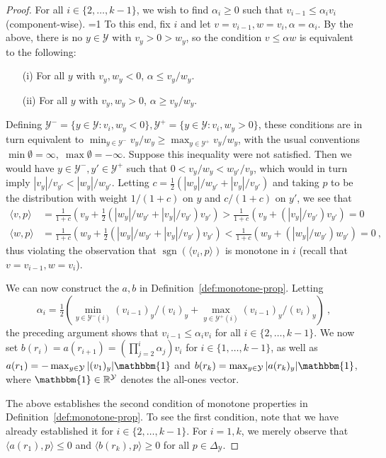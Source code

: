 \documentclass[anon,12pt]{colt2019}
\newcommand{\Comments}{1}
\newcommand{\mytodo}[2]{\ifnum\Comments=1%
  \todo[linecolor=#1!80!black,backgroundcolor=#1,bordercolor=#1!80!black]{#2}\fi}
\newcommand{\jessiet}[1]{\mytodo{purple!20!white}{JF: #1}}
\newcommand{\reals}{\mathbb{R}}
\newcommand{\simplex}{\Delta_\Y}
\newcommand{\Y}{\mathcal{Y}}
\newcommand{\inprod}[2]{\langle #1, #2 \rangle}%
\newcommand{\ones}{\mathbbm{1}}
\DeclareMathOperator*{\sgn}{sgn}
\begin{document}
\begin{proof}
  For all $i\in\{2,\ldots,k-1\}$, we wish to find $\alpha_i \geq 0$ such that $v_{i-1} \leq \alpha_i v_i$ (component-wise).
  \jessiet{How should $w$ be interpreted?}
  To this end, fix $i$ and let $v = v_{i-1}, w = v_{i}, \alpha=\alpha_i$.
  By the above, there is no $y\in\Y$ with $v_y > 0 > w_y$, so the condition $v \leq \alpha w$ is equivalent to the following:
  \begin{enumerate}
  \item[(i)] For all $y$ with $v_y,w_y < 0$, $\alpha \leq v_y/w_y$.
  \item[(ii)] For all $y$ with $v_y,w_y > 0$, $\alpha \geq v_y/w_y$.
  \end{enumerate}
  Defining $\Y^- = \{y\in\Y: v_i,w_y < 0\}, \Y^+ = \{y\in\Y: v_i,w_y > 0\}$, these conditions are in turn equivalent to $\min_{y\in\Y^-} v_y/w_y \geq \max_{y\in\Y^+} v_y/w_y$, with the usual conventions $\min \emptyset = \infty,\; \max \emptyset = -\infty$.
  Suppose this inequality were not satisfied.
  Then we would have $y \in \Y^-,y'\in\Y^+$ such that $0 < v_y/w_y < w_{y'}/v_y$, which would in turn imply $|v_y|/v_{y'} < |w_y| / w_{y'}$.
  Letting $c = \tfrac 1 2 \left(|w_y| / w_{y'} + |v_y|/v_{y'}\right)$ and taking $p$ to be the distribution with weight $1/(1+c)$ on $y$ and $c/(1+c)$ on $y'$, we see that
  \begin{align*}
    \inprod{v}{p} &= \frac 1 {1+c} \left(v_y + \tfrac 1 2 (|w_y| / w_{y'} + |v_y|/v_{y'})v_{y'}\right) > \frac 1 {1+c} \left(v_y + (|v_y|/v_{y'})v_{y'}\right) = 0
    \\
    \inprod{w}{p} &= \frac 1 {1+c} \left(w_y + \tfrac 1 2 (|w_y| / w_{y'} + |v_y|/v_{y'})v_{y'}\right) < \frac 1 {1+c} \left(w_y + (|w_y|/w_{y'})w_{y'}\right) = 0~,
  \end{align*}
  thus violating the observation that $\sgn(\inprod{v_i}{p})$ is monotone in $i$ (recall that $v = v_{i-1}, w = v_{i}$).

  We can now construct the $a,b$ in Definition~\ref{def:monotone-prop}.
  Letting
  \[\alpha_i = \tfrac 1 2 \left(\min_{y\in\Y^-(i)} (v_{i-1})_y/(v_{i})_y + \max_{y\in\Y^+(i)} (v_{i-1})_y/(v_{i})_y\right)~,\] the preceding argument shows that $v_{i-1} \leq \alpha_i v_{i}$ for all $i \in \{2,\ldots,k-1\}$.
  We now set $b(r_i) = a(r_{i+1}) = (\prod_{j=2}^i \alpha_j) v_i$ for $i\in\{1,\ldots,k-1\}$, as well as $a(r_1) = -\max_{y\in\Y} |(v_1)_y|\ones$ and $b(r_k) = \max_{y\in\Y} |a(r_k)_y|\ones$, where $\ones\in\reals^\Y$ denotes the all-ones vector.

  The above establishes the second condition of monotone properties in Definition~\ref{def:monotone-prop}.
  To see the first condition, note that we have already established it for $i\in\{2,\ldots,k-1\}$.
  For $i=1,k$, we merely observe that $\inprod{a(r_1)}{p} \leq 0$ and $\inprod{b(r_k)}{p} \geq 0$ for all $p\in\simplex$.
\end{proof}
\end{document}
